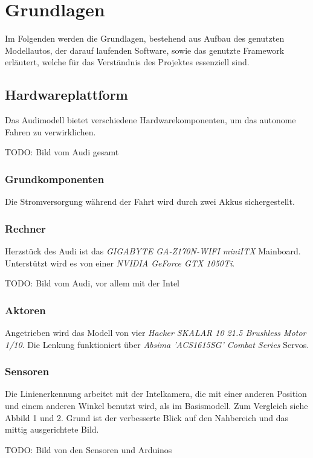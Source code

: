 \documentclass[12pt, a4paper]{scrartcl}
\begin{document}
\newpage
\section{Grundlagen}
Im Folgenden werden die Grundlagen, bestehend aus Aufbau des genutzten Modellautos, der darauf laufenden Software, sowie das genutzte Framework erläutert, welche für das Verständnis des Projektes essenziell sind.

\subsection{Hardwareplattform}
Das Audimodell bietet verschiedene Hardwarekomponenten, um das autonome Fahren zu verwirklichen.

TODO: Bild vom Audi gesamt

\subsubsection{Grundkomponenten}
Die Stromversorgung während der Fahrt wird durch zwei Akkus sichergestellt.

\subsubsection{Rechner}
Herzstück des Audi ist das \emph{GIGABYTE GA-Z170N-WIFI miniITX} Mainboard. Unterstützt wird es von einer \emph{NVIDIA GeForce GTX 1050Ti}. 

TODO: Bild vom Audi, vor allem mit der Intel

\subsubsection{Aktoren}
Angetrieben wird das Modell von vier \emph{Hacker SKALAR 10 21.5 Brushless Motor 1/10}.
Die Lenkung funktioniert über \emph{Absima 'ACS1615SG' Combat Series} Servos. 

\subsubsection{Sensoren}
Die Linienerkennung arbeitet mit der Intelkamera, die mit einer anderen Position und einem anderen Winkel benutzt wird, als im Basismodell. Zum Vergleich siehe Abbild 1 und 2. Grund ist der verbesserte Blick auf den Nahbereich und das mittig ausgerichtete Bild.

TODO: Bild von den Sensoren und Arduinos
\end{document}
